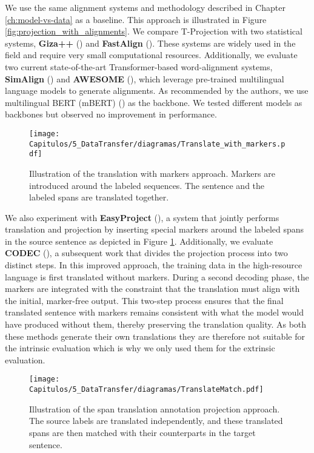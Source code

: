 We use the same alignment systems and methodology described in Chapter \ref{ch:model-vs-data} as a baseline. This approach is illustrated in Figure \ref{fig:projection_with_alignments}. We compare T-Projection with two statistical systems, \textbf{Giza++} (\cite{och-ney-2003-systematic-giza}) and \textbf{FastAlign} (\cite{dyer-etal-2013-simple-fastalign}). These systems are widely used in the field and require very small computational resources. Additionally, we evaluate two current state-of-the-art Transformer-based word-alignment systems, \textbf{SimAlign} (\cite{jalili-sabet-etal-2020-simalign}) and \textbf{AWESOME} (\cite{dou-neubig-2021-word}), which leverage pre-trained multilingual language models to generate alignments. As recommended by the authors, we use multilingual BERT (mBERT) (\cite{devlin-etal-2019-bert}) as the backbone. We tested different models as backbones but observed no improvement in performance. 

\begin{figure}[htb]
    \centering
    \texttt{[image: Capitulos/5\_DataTransfer/diagramas/Translate\_with\_markers.pdf]}
    \caption{Illustration of the translation with markers approach. Markers are introduced around the labeled sequences. The sentence and the labeled spans are translated together.}
    \label{fig:projection_with_markers}
\end{figure}

We also experiment with \textbf{EasyProject} (\cite{chen-etal-2023-frustratingly}), a system that jointly performs translation and projection by inserting special markers around the labeled spans in the source sentence as depicted in Figure \ref{fig:projection_with_markers}. Additionally, we evaluate \textbf{CODEC} (\cite{DBLP:journals/corr/abs-2402-03131}), a subsequent work that divides the projection process into two distinct steps. In this improved approach, the training data in the high-resource language is first translated without markers. During a second decoding phase, the markers are integrated with the constraint that the translation must align with the initial, marker-free output. This two-step process ensures that the final translated sentence with markers remains consistent with what the model would have produced without them, thereby preserving the translation quality. As both these methods generate their own translations they are therefore not suitable for the intrinsic evaluation which is why we only used them for the extrinsic evaluation. 

\begin{figure}[htb]
    \centering
    \texttt{[image: Capitulos/5\_DataTransfer/diagramas/TranslateMatch.pdf]}
    \caption{Illustration of the span translation annotation projection approach. The source labels are translated independently, and these translated spans are then matched with their counterparts in the target sentence.}
    \label{fig:projection_translate_match}
\end{figure}


